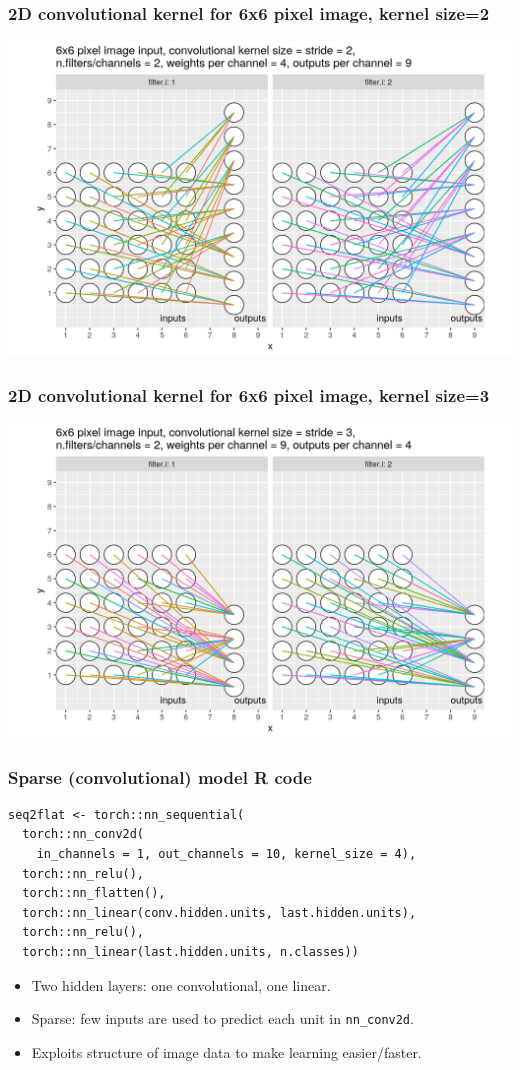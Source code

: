 \documentclass{beamer}
\begin{document}
\begin{frame}
  \frametitle{2D convolutional kernel for 6x6 pixel image, kernel size=2}
  \includegraphics[width=\textwidth]{figure-conv2d-6x6-kernel=2}
\end{frame}

\begin{frame}
  \frametitle{2D convolutional kernel for 6x6 pixel image, kernel size=3}
  \includegraphics[width=\textwidth]{figure-conv2d-6x6-kernel=3}
\end{frame}

\begin{frame}[fragile]
  \frametitle{Sparse (convolutional) model R code}

\begin{verbatim}
seq2flat <- torch::nn_sequential(
  torch::nn_conv2d(
    in_channels = 1, out_channels = 10, kernel_size = 4),
  torch::nn_relu(),
  torch::nn_flatten(),
  torch::nn_linear(conv.hidden.units, last.hidden.units),
  torch::nn_relu(),
  torch::nn_linear(last.hidden.units, n.classes))
\end{verbatim}

  \begin{itemize}
  \item Two hidden layers: one convolutional, one linear.
  \item Sparse: few inputs are used to predict each unit in
    \texttt{nn\_conv2d}.
  \item Exploits structure of image data to make learning
    easier/faster.
  \end{itemize}

\end{frame}
 
\end{document}
